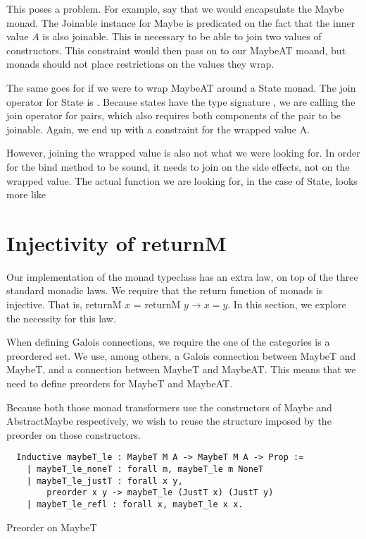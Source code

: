 This poses a problem. For example, say that we would encapsulate the Maybe
monad. The Joinable instance for Maybe is predicated on the fact that the inner
value $A$ is also joinable. This is necessary to be able to join two values of
 constructors. This constraint would then pass on to our MaybeAT
moand, but monads should not place restrictions on the values they wrap.

The same goes for if we were to wrap MaybeAT around a State monad. The join
operator for State is 
.
Because states have the type signature , we are calling the
join operator for pairs, which also requires both components of the pair to be
joinable. Again, we end up with a constraint for the wrapped value A.

However, joining the wrapped value is also not what we were looking for. In
order for the bind method to be sound, it needs to join on the side effects,
not on the wrapped value. The actual function we are looking for, in the case
of State, looks more like 

\section{Injectivity of returnM}
Our implementation of the monad typeclass has an extra law, on top of the three
standard monadic laws. We require that the return function of monads is
injective. That is, returnM $x$ = returnM $y \rightarrow x = y$. In this
section, we explore the necessity for this law.

When defining Galois connections, we require the one of the categories is a
preordered set. We use, among others,  a Galois connection between MaybeT and 
MaybeT, and a connection between MaybeT and MaybeAT. This means that we need to
define  preorders for MaybeT and MaybeAT.

Because both those monad transformers use the constructors of Maybe and
AbstractMaybe respectively, we wish to reuse the structure imposed by the
preorder on those constructors.

\begin{listing}
\begin{verbatim}
  Inductive maybeT_le : MaybeT M A -> MaybeT M A -> Prop :=
    | maybeT_le_noneT : forall m, maybeT_le m NoneT
    | maybeT_le_justT : forall x y, 
        preorder x y -> maybeT_le (JustT x) (JustT y)
    | maybeT_le_refl : forall x, maybeT_le x x.
\end{verbatim}
\caption{Preorder on MaybeT}
\label{lst:preorder_maybeT}
\end{listing}

